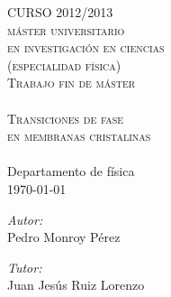 \begin{titlepage}
\begin{center}


\textsc{\LARGE CURSO 2012/2013}\\[0.5cm]
\textsc{\LARGE máster universitario}\\[0.3cm]
\textsc{\LARGE en investigación en ciencias}\\[0.3cm]
\textsc{\LARGE (especialidad física)}\\[1.5cm]

\textsc{\Large Trabajo fin de máster}\\[0.5cm]

\HRule \\[0.4cm]
\textsc{{ \Huge Transiciones de fase\\[0.3cm] en membranas cristalinas}}\\[0.4cm]
\HRule \\[0.9cm]

{\Large Departamento de física}\\[1.6cm]
{\large \today}
\vfill
\begin{minipage}{0.4\textwidth}
\begin{flushleft} \large
\emph{Autor:}\\
Pedro Monroy Pérez
\end{flushleft}
\end{minipage}
\begin{minipage}{0.4\textwidth}
\begin{flushright} \large
\emph{Tutor:} \\
Juan Jesús Ruiz Lorenzo
\end{flushright}
\end{minipage}




\end{center}
\end{titlepage}


